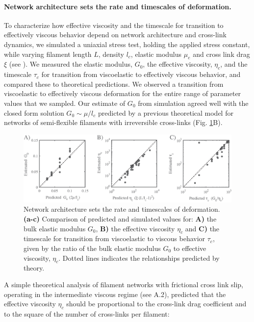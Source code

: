 \paragraph{Network architecture sets the rate and timescales of deformation.}  To characterize how effective viscosity and the timescale for transition to effectively viscous behavior depend on network architecture and cross-link dynamics, we simulated a uniaxial stress test, holding the applied stress constant, while varying filament length $L$, density $l_c$,  elastic modulus $\mu_e$ and cross link drag $\xi$ (see ). We measured the elastic modulus, $G_0$, the effective viscosity, $\eta_c$, and the timescale $\tau_c$ for transition from viscoelastic to effectively viscous behavior, and compared these to theoretical predictions. We observed a transition from viscoelastic to effectively viscous deformation for the entire range of parameter values that we sampled.  Our estimate of $G_0$ from simulation agreed well with the closed form solution  $G_0 \sim \mu/l_c$ predicted by a previous theoretical model \cite{theo_hlm} for networks of semi-flexible filaments with irreversible cross-links (Fig. \ref{fig:passive_form}B). 

\begin{figure}[h!]
	\centering
	\includegraphics[width=\hsize]{active/figures/Fig3}
	\caption{\label{fig:passive_form} Network architecture sets the rate and timescales of deformation.  \textbf{(a-c)} Comparison of predicted and simulated values for: \textbf{A)} the bulk elastic modulus $G_0$,  \textbf{B)} the effective viscosity $\eta_c$ and \textbf{C)} the timescale for transition from viscoelastic to viscous behavior $\tau_c$, given by the ratio of the bulk elastic modulus $G_0$ to effective viscosity, $\eta_c$. Dotted lines indicates the relationships predicted by theory. }
\end{figure}

A simple theoretical analysis of filament networks with frictional cross link slip, operating in the intermediate viscous regime (see  A.2), predicted that the effective viscosity $\eta_c$ should be proportional to the cross-link drag coefficient and to the square of the number of cross-links per filament:

